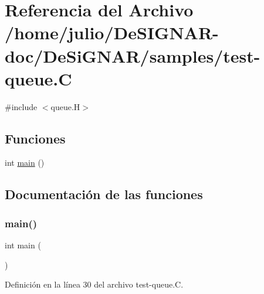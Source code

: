 \hypertarget{test-queue_8_c}{}\section{Referencia del Archivo /home/julio/\+De\+S\+I\+G\+N\+A\+R-\/doc/\+De\+Si\+G\+N\+A\+R/samples/test-\/queue.C}
\label{test-queue_8_c}
{\ttfamily \#include $<$queue.\+H$>$}\newline
\subsection*{Funciones}
\begin{DoxyCompactItemize}
\item 
int \hyperlink{test-queue_8_c_ae66f6b31b5ad750f1fe042a706a4e3d4}{main} ()
\end{DoxyCompactItemize}


\subsection{Documentación de las funciones}
\mbox{\label{test-queue_8_c_ae66f6b31b5ad750f1fe042a706a4e3d4}} 
\subsubsection{\texorpdfstring{main()}{main()}}
{\footnotesize\ttfamily int main (\begin{DoxyParamCaption}{ }\end{DoxyParamCaption})}



Definición en la línea 30 del archivo test-\/queue.\+C.

